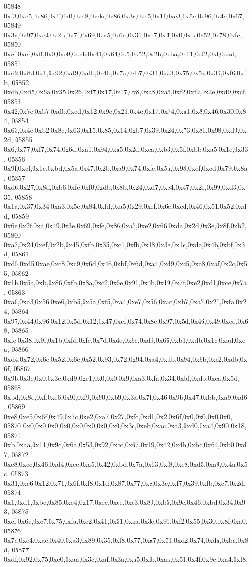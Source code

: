 \begin{DoxyCode}
05848   0xf3,0xc5,0x86,0xff,0x0,0xd8,0xda,0x86,0x3e,0xe5,0x1f,0xe3,0x5e,0x96,0x4e,0x67,
05849   0x3a,0x97,0xc4,0x2b,0x7f,0x69,0xa5,0x6a,0x31,0xe7,0xff,0x0,0xb,0x52,0x78,0xfe,
05850   0xcf,0xcf,0xff,0x0,0xc9,0xcb,0x41,0x64,0x5,0x52,0x2b,0xba,0x11,0xf2,0xf,0xad,
05851   0xd2,0x8d,0x1,0x92,0xd9,0xdb,0x4b,0x7a,0xb7,0x34,0xa3,0x75,0x5a,0x36,0xf6,0xfb,
05852   0xdb,0xd5,0x6a,0x35,0x26,0xf7,0x17,0x17,0x8,0xa8,0xa6,0xf2,0xf9,0x2e,0xd9,0xcf,
05853   0x42,0x7c,0xb7,0xdb,0xcd,0x12,0x9c,0x21,0x4e,0x17,0x74,0xa1,0x8,0x46,0x30,0x84,
05854   0x63,0x4e,0xb2,0x8c,0x63,0x15,0x85,0x14,0xb7,0x39,0x24,0x73,0x81,0x98,0xd9,0x2d,
05855   0x6,0x77,0xf7,0x74,0x6d,0xa1,0x94,0xa5,0x2d,0xea,0xb3,0x5f,0xbb,0xa5,0x1e,0x33,
05856   0x9f,0xcf,0x1c,0xbd,0x5a,0x47,0x2b,0xa9,0x74,0xfc,0x5a,0x98,0xef,0xcd,0x79,0x8a,
05857   0xd6,0x27,0x8d,0xb6,0xfc,0xf0,0xdb,0x8b,0x24,0xd7,0xc4,0x47,0x2e,0x99,0xd3,0x35,
05858   0x1a,0x37,0x34,0xa3,0x5e,0x84,0xfd,0xa5,0x29,0xef,0x6e,0xcd,0x46,0x51,0x52,0xdd,
05859   0x6e,0x2f,0xa,0x49,0x3e,0x69,0xfe,0x86,0xa7,0xe2,0x66,0xda,0x2d,0x3e,0x8f,0xb2,
05860   0xa3,0x24,0xef,0x2b,0x45,0xfb,0x35,0xc1,0xfb,0x18,0x3e,0x1e,0xda,0x4b,0xbf,0x3d,
05861   0xd5,0xd5,0xae,0xc8,0xc9,0x6d,0x46,0xbf,0x6d,0xa4,0xd9,0xc5,0xa8,0xaf,0x2c,0x55,
05862   0x1b,0x5a,0xb,0x86,0xfb,0x8a,0xc2,0x5e,0x91,0x4b,0x19,0x7f,0xe2,0xd1,0xce,0x7a,
05863   0xa6,0xa3,0x56,0xe6,0xb5,0x5a,0xf5,0xa4,0xe7,0x56,0xac,0xb7,0xa7,0x27,0xfa,0x24,
05864   0x97,0x44,0x96,0x12,0x5d,0x12,0x47,0xcf,0x74,0x8e,0x97,0x5d,0x46,0x49,0xcd,0x68,
05865   0xfe,0x38,0x9f,0x1b,0xfd,0xfe,0x7d,0xde,0x9c,0xd9,0x66,0xb1,0xdb,0x1c,0xad,0xea,
05866   0xd4,0x72,0x6e,0x52,0x6e,0x52,0x93,0x72,0x94,0xa4,0xdb,0x94,0x9b,0xe2,0xdb,0x6f,
05867   0x9b,0x3e,0x0,0x3e,0xd9,0xe1,0x0,0x0,0x9,0xa3,0xfa,0x34,0xbf,0xdb,0xea,0x5d,
05868   0xbd,0x8d,0xf,0xe6,0x9f,0xf9,0x90,0xb9,0x3a,0x7f,0x46,0x9b,0x47,0xbb,0xa9,0xd6,
05869   0xe8,0xe5,0x6f,0x49,0x7c,0xe2,0xa7,0x27,0xfc,0xd1,0x2,0x6f,0x0,0x0,0x0,0x0,
05870   0x0,0x0,0x0,0x0,0x0,0x0,0x0,0x0,0x3c,0xeb,0xac,0xa3,0xd0,0xa4,0x90,0x18,
05871   0xb,0xaa,0x11,0x9c,0x6a,0x53,0x92,0xcc,0x67,0x19,0x42,0x4b,0xbc,0x64,0xb0,0xd7,
05872   0xe8,0xce,0x46,0xd4,0xec,0xa5,0x42,0xbd,0x7a,0x13,0xf8,0xe8,0xd5,0xa9,0x4a,0x5c,
05873   0x31,0xc6,0x12,0x71,0x6f,0xf8,0x1d,0x87,0x77,0xc,0x3c,0xf7,0x39,0xfb,0xc7,0x2d,
05874   0x1,0xd1,0xbc,0x85,0xe4,0x17,0xec,0xee,0xe3,0x89,0xb5,0x9c,0x46,0xbd,0x34,0x93,
05875   0xcf,0x6c,0xc7,0x75,0xfa,0xe2,0x41,0x51,0xaa,0x3e,0x91,0xf2,0x55,0x30,0x8f,0xa0,
05876   0x7c,0xe4,0xae,0x40,0xa3,0x89,0x35,0xf8,0x77,0xa7,0x51,0xd2,0x74,0xda,0xba,0x8d,
05877   0xdf,0x92,0x75,0xe0,0xaa,0x3c,0xaf,0x3a,0xa5,0xfb,0xaa,0x51,0x4f,0x9c,0xa4,0xf8,

\end{DoxyCode}
